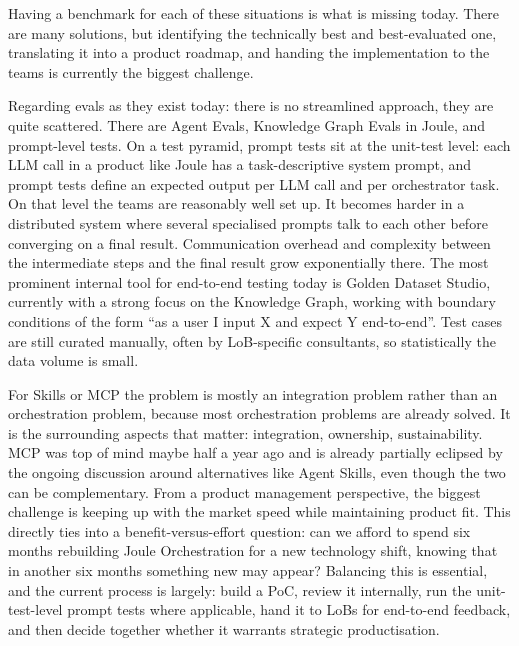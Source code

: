 Having a benchmark for each of these situations is what is missing today. There are many solutions, but identifying the technically best and best-evaluated one, translating it into a product roadmap, and handing the implementation to the teams is currently the biggest challenge.

Regarding evals as they exist today: there is no streamlined approach, they are quite scattered. There are Agent Evals, Knowledge Graph Evals in Joule, and prompt-level tests. On a test pyramid, prompt tests sit at the unit-test level: each LLM call in a product like Joule has a task-descriptive system prompt, and prompt tests define an expected output per LLM call and per orchestrator task. On that level the teams are reasonably well set up. It becomes harder in a distributed system where several specialised prompts talk to each other before converging on a final result. Communication overhead and complexity between the intermediate steps and the final result grow exponentially there. The most prominent internal tool for end-to-end testing today is Golden Dataset Studio, currently with a strong focus on the Knowledge Graph, working with boundary conditions of the form ``as a user I input X and expect Y end-to-end''. Test cases are still curated manually, often by LoB-specific consultants, so statistically the data volume is small.

\medskip{}

For Skills or MCP the problem is mostly an integration problem rather than an orchestration problem, because most orchestration problems are already solved. It is the surrounding aspects that matter: integration, ownership, sustainability. MCP was top of mind maybe half a year ago and is already partially eclipsed by the ongoing discussion around alternatives like Agent Skills, even though the two can be complementary. From a product management perspective, the biggest challenge is keeping up with the market speed while maintaining product fit. This directly ties into a benefit-versus-effort question: can we afford to spend six months rebuilding Joule Orchestration for a new technology shift, knowing that in another six months something new may appear? Balancing this is essential, and the current process is largely: build a PoC, review it internally, run the unit-test-level prompt tests where applicable, hand it to LoBs for end-to-end feedback, and then decide together whether it warrants strategic productisation.

